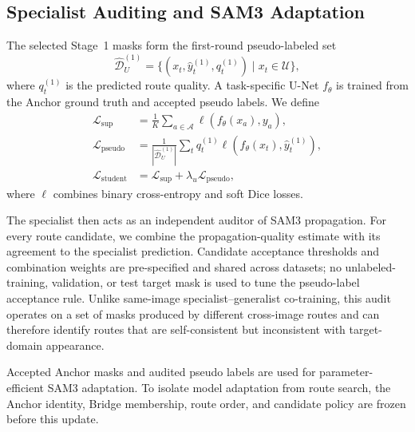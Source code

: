 \documentclass[a4paper,fleqn]{cas-dc}
\begin{document}
\subsection{Specialist Auditing and SAM3 Adaptation}\label{sec:collaboration}

The selected Stage~1 masks form the first-round pseudo-labeled set
\begin{equation}
\widehat{\mathcal{D}}_{U}^{(1)}=\{(x_t,\hat{y}_t^{(1)},q_t^{(1)})\mid x_t\in\mathcal{U}\},
\end{equation}
where $q_t^{(1)}$ is the predicted route quality. A task-specific U-Net $f_{\theta}$ is trained from the Anchor ground truth and accepted pseudo labels. We define
\begin{equation}
\begin{aligned}
\mathcal{L}_{\mathrm{sup}}&=\frac{1}{K}\sum_{a\in\mathcal{A}}
\ell(f_{\theta}(x_a),y_a),\\
\mathcal{L}_{\mathrm{pseudo}}&=\frac{1}{|\widehat{\mathcal{D}}_{U}^{(1)}|}
\sum_t q_t^{(1)}\ell(f_{\theta}(x_t),\hat{y}_t^{(1)}),\\
\mathcal{L}_{\mathrm{student}}&=\mathcal{L}_{\mathrm{sup}}
+\lambda_u\mathcal{L}_{\mathrm{pseudo}},
\end{aligned}
\end{equation}
where $\ell$ combines binary cross-entropy and soft Dice losses.

The specialist then acts as an independent auditor of SAM3 propagation. For every route candidate, we combine the propagation-quality estimate with its agreement to the specialist prediction. Candidate acceptance thresholds and combination weights are pre-specified and shared across datasets; no unlabeled-training, validation, or test target mask is used to tune the pseudo-label acceptance rule. Unlike same-image specialist--generalist co-training, this audit operates on a set of masks produced by different cross-image routes and can therefore identify routes that are self-consistent but inconsistent with target-domain appearance.

Accepted Anchor masks and audited pseudo labels are used for parameter-efficient SAM3 adaptation. To isolate model adaptation from route search, the Anchor identity, Bridge membership, route order, and candidate policy are frozen before this update.

\end{document}

